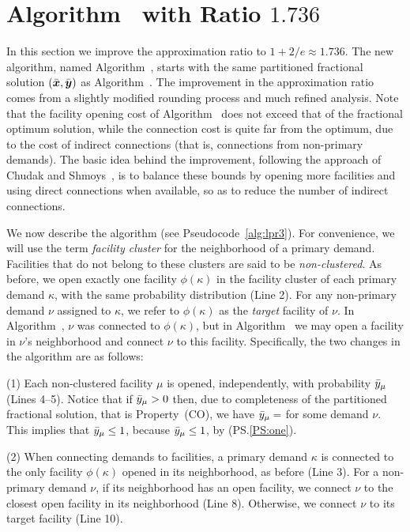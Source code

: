\section{Algorithm~{\ECHS} with Ratio $1.736$}\label{sec: 1.736-approximation}

In this section we improve the approximation ratio to $1+2/e
\approx 1.736$. The new algorithm, named Algorithm~{\ECHS},
starts with the same partitioned fractional solution
$(\bar{\boldsymbol{x}}, \bar{\boldsymbol{y}})$ as Algorithm~{\EGUP}. The improvement
in the approximation ratio comes from a slightly modified
rounding process and much refined analysis.  Note that the
facility opening cost of Algorithm~{\EGUP} does not exceed
that of the fractional optimum solution, while the
connection cost is quite far from the optimum, due to the
cost of indirect connections (that is, connections from
non-primary demands).  The basic idea behind the
improvement, following the approach of Chudak and
Shmoys~\cite{ChudakS04}, is to balance these bounds by
opening more facilities
and using direct connections when available, so as to reduce
the number of indirect connections. 

We now describe the algorithm (see Pseudocode~\ref{alg:lpr3}).  
For convenience, we will use the term
\emph{facility cluster} for the neighborhood of a primary
demand. Facilities that do not belong to these clusters are
said to be \emph{non-clustered}.
As before, we open exactly one facility $\phi(\kappa)$ in
the facility cluster of each primary demand $\kappa$, with the
same probability distribution (Line 2).  For any
non-primary demand $\nu$ assigned to $\kappa$, we refer to
$\phi(\kappa)$ as the \emph{target} facility of $\nu$.  In
Algorithm~{\EGUP}, $\nu$ was connected to $\phi(\kappa)$,
but in Algorithm~{\ECHS} we may open a facility in $\nu$'s
neighborhood and connect $\nu$ to this facility.
Specifically, the two changes in the algorithm are as
follows: 
%
\begin{description}
	\item{(1)} Each non-clustered facility $\mu$ is opened,
independently, with probability ${\bar y}_{\mu}$ (Lines
4--5). Notice that if ${\bar y}_\mu>0$ then,
due to completeness of the partitioned
fractional solution, that is Property~(CO), we have ${\bar y}_{\mu}=$
for some demand $\nu$. This implies that ${\bar y}_{\mu}\leq 1$,
because ${\bar y}_{\mu}\le 1$, by (PS.\ref{PS:one}).
%
	\item{(2)} When connecting demands to facilities, a primary demand
$\kappa$ is connected to the only facility $\phi(\kappa)$
opened in its neighborhood, as before (Line 3).  For a
non-primary demand $\nu$, if its neighborhood has an open
facility, we connect $\nu$ to the closest open facility in
its neighborhood (Line 8). Otherwise, we connect $\nu$ to
its target facility (Line 10).
%
\end{description}

